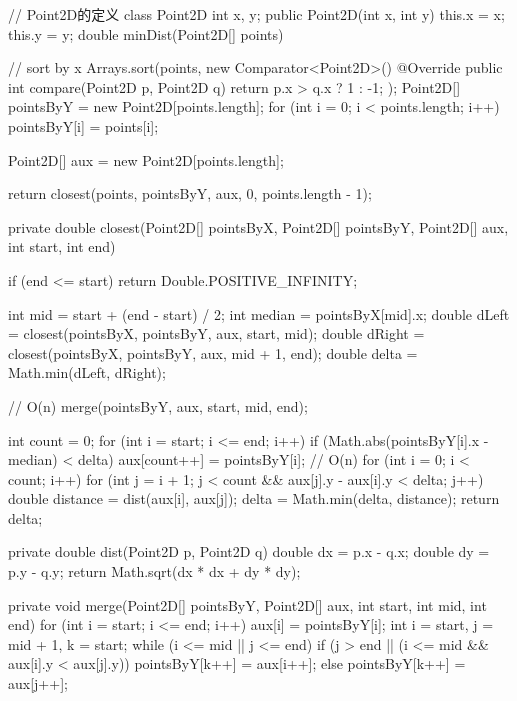 \begin{Codex}[label={[$O(nlgn)+O(n)$]Chap02_11_ClosestPairOfPoints.java}]
	// Point2D的定义
	class Point2D {
		int x, y;
		public Point2D(int x, int y) {
			this.x = x;
			this.y = y;
		}
	}
	double minDist(Point2D[] points) {
		// sort by x
		Arrays.sort(points, new Comparator<Point2D>() {
			@Override
			public int compare(Point2D p, Point2D q) {
				return p.x > q.x ? 1 : -1;
			}
		});
		Point2D[] pointsByY = new Point2D[points.length];
		for (int i = 0; i < points.length; i++) {
			pointsByY[i] = points[i];
		}
		
		Point2D[] aux = new Point2D[points.length];
		
		return closest(points, pointsByY, aux, 0, points.length - 1);
	}
	
	private double closest(Point2D[] pointsByX, Point2D[] pointsByY, Point2D[] aux, int start, int end) {
		if (end <= start) {
			return Double.POSITIVE_INFINITY;
		}
		
		int mid = start + (end - start) / 2;
		int median = pointsByX[mid].x;
		double dLeft = closest(pointsByX, pointsByY, aux, start, mid);
		double dRight = closest(pointsByX, pointsByY, aux, mid + 1, end);
		double delta = Math.min(dLeft, dRight);
		
		// O(n)
		merge(pointsByY, aux, start, mid, end);
		
		int count = 0;
		for (int i = start; i <= end; i++) {
			if (Math.abs(pointsByY[i].x - median) < delta) {
				aux[count++] = pointsByY[i];
			}
		}
		// O(n)
		for (int i = 0; i < count; i++) {
			for (int j = i + 1; j < count && aux[j].y - aux[i].y < delta; j++) {
				double distance = dist(aux[i], aux[j]);
				delta = Math.min(delta, distance);
			}
		}
		return delta;
	}
	
	private double dist(Point2D p, Point2D q) {
		double dx = p.x - q.x;
		double dy = p.y - q.y;
		return Math.sqrt(dx * dx + dy * dy);
	}
	
	private void merge(Point2D[] pointsByY, Point2D[] aux, int start, int mid, int end) {
		for (int i = start; i <= end; i++) {
			aux[i] = pointsByY[i];
		}
		int i = start, j = mid + 1, k = start;
		while (i <= mid || j <= end) {
			if (j > end || (i <= mid && aux[i].y < aux[j].y)) {
				pointsByY[k++] = aux[i++];
			} else {
			pointsByY[k++] = aux[j++];
		}
	}
}
\end{Codex}


